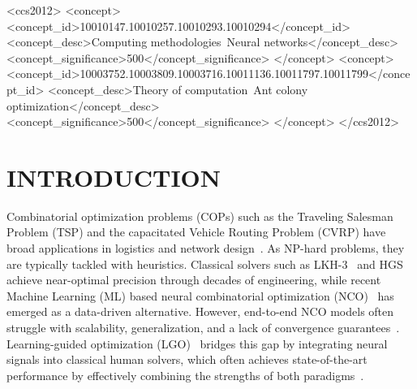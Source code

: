 \documentclass[sigconf]{acmart}
\newcommand{\TSP}{\textsc{TSP}}
\newcommand{\CVRP}{\textsc{CVRP}}
\begin{document}
\begin{CCSXML}
<ccs2012>
   <concept>
       <concept_id>10010147.10010257.10010293.10010294</concept_id>
       <concept_desc>Computing methodologies~Neural networks</concept_desc>
       <concept_significance>500</concept_significance>
   </concept>
   <concept>
       <concept_id>10003752.10003809.10003716.10011136.10011797.10011799</concept_id>
       <concept_desc>Theory of computation~Ant colony optimization</concept_desc>
       <concept_significance>500</concept_significance>
   </concept>
 </ccs2012>
\end{CCSXML}



\maketitle



\section{INTRODUCTION}

Combinatorial optimization problems (COPs) such as the Traveling Salesman Problem (\TSP{}) and the capacitated Vehicle Routing Problem (\CVRP{}) have broad applications in logistics and network design~\cite{TSPAPP}.
As NP-hard problems, they are typically tackled with heuristics.
Classical solvers such as LKH-3~\cite{lkhtsp, lkhcvrp} and HGS~\cite{hgs} achieve near-optimal precision through decades of engineering, while recent Machine Learning (ML) based neural combinatorial optimization (NCO)~\cite{MLCO, RL4CO,neuopt,2optlearning} has emerged as a data-driven alternative. However, end-to-end NCO models often struggle with scalability, generalization, and a lack of convergence guarantees~\cite{RL4CO}. Learning-guided optimization (LGO)~\cite{learn2branch, learn2delegate, learn2optimize, neurolkh, li2023learning} bridges this gap by integrating neural signals into classical human solvers, which often achieves state-of-the-art performance by effectively combining the strengths of both paradigms~\cite{learn2delegate,deepaco,learn2seg,huang2024contrastive}.
\end{document}
